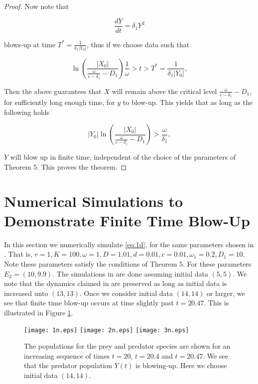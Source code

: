\documentclass[10pt]{amsart}
\theoremstyle{definition}
\begin{document}
\begin{proof}
 Now note that

\begin{equation*}
\frac{dY}{dt}=\delta_{1} Y^{2}
\end{equation*}

blows-up at time $T^{*} = \frac{1}{\delta_{1}|Y_{0}|}$, thus if we choose data such that

\begin{equation*}
  \ln\left( \frac{|X_{0}|}{\frac{\omega}{c- \delta_{1}} - D_{1}} \right) \frac{1}{\omega}> t > T^{*} = \frac{1}{\delta_{1}|Y_{0}|},
\end{equation*}

Then the above guarantees that $X$ will remain above the critical level $ \frac{\omega}{c- \delta_{1}} - D_{1}$, for sufficiently long enough time, for $y$ to blow-up. This yields that as long as the following holds

\begin{equation*}
|Y_{0}|   \ln\left( \frac{|X_{0}|}{\frac{\omega}{c- \delta_{1}} - D_{1}} \right) >\frac{\omega}{\delta_{1}},
\end{equation*}

$Y$ will blow up in finite time, independent of the choice of the parameters of Theorem 5. This proves the theorem.

\end{proof}

\section{Numerical Simulations to Demonstrate Finite Time Blow-Up}
In this section we numerically simulate \eqref{eq:1d}, for the same parameters chosen in \cite{RK15}. That is, $r=1, K=100, \omega=1, D=1.01, d=0.01, c=0.01, \omega_{1}=0.2, D_{1}=10$. Note these parameters satisfy the conditions of Theorem 5. For these parameters $E_{2}=(10,9.9)$. The simulations in \cite{RK15} are done assuming initial data $(5,5)$. We note that the dynamics claimed in \cite{RK15} are preserved as long as initial data is increased unto $(13,13)$. Once we consider initial data 
$(14,14)$ or larger, we see that finite time blow-up occurs at time slightly past $t=20.47$. This is illustrated in Figure \ref{fig:1t}.

\begin{figure}[htb]
{
\texttt{[image: 1n.eps]}}
{
\texttt{[image: 2n.eps]}}
{
\texttt{[image: 3n.eps]}}
\caption{The populations for the prey and predator species are shown for an increasing sequence of times $t=20$, $t=20.4$ and $t=20.47$. We see that the predator population $Y(t)$ is blowing-up. Here we choose initial data $(14,14)$.}
\label{fig:1t}
\end{figure}
\end{document}
